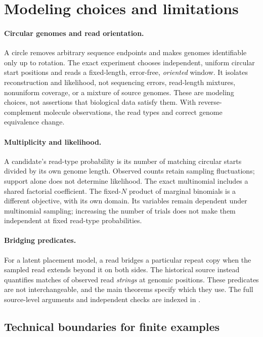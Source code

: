 \section{Modeling choices and limitations}
\label{app:modeling}

\paragraph{Circular genomes and read orientation.}
A circle removes arbitrary sequence endpoints and makes genomes
identifiable only up to rotation. The exact experiment chooses independent,
uniform circular start positions and reads a fixed-length, error-free,
\emph{oriented} window. It isolates reconstruction and likelihood, not
sequencing errors, read-length mixtures, nonuniform coverage, or a mixture
of source genomes. These are modeling choices, not assertions that biological
data satisfy them. With reverse-complement molecule observations, the read
types and correct genome equivalence change.

\paragraph{Multiplicity and likelihood.}
A candidate's read-type probability is its number of matching circular
starts divided by its own genome length. Observed counts retain sampling
fluctuations; support alone does not determine likelihood. The exact
multinomial includes a shared factorial coefficient. The fixed-$N$
product of marginal binomials is a different objective, with its
own domain. Its variables remain dependent under multinomial sampling;
increasing the number of trials does not make them independent at
fixed read-type probabilities.

\paragraph{Bridging predicates.}
For a latent placement model, a read bridges a particular repeat copy
when the sampled read extends beyond it on both sides. The historical
source instead quantifies matches of observed read \emph{strings} at
genomic positions. These predicates are not interchangeable, and the
main theorems specify which they use. The full source-level arguments
and independent checks are indexed in .

\subsection{Technical boundaries for finite examples}
\label{app:finite-domain-boundaries}

